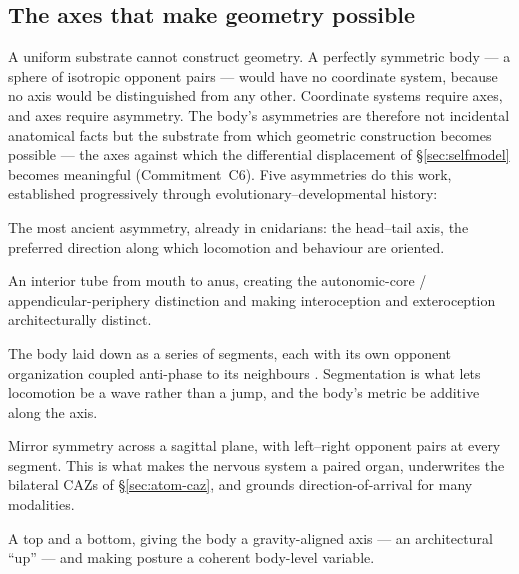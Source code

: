 \documentclass{article}
\begin{document}
\subsection{The axes that make geometry possible}\label{sec:kit-axes}

A uniform substrate cannot construct geometry.  A perfectly symmetric
body --- a sphere of isotropic opponent pairs --- would have no
coordinate system, because no axis would be distinguished from any
other.  Coordinate systems require axes, and axes require asymmetry.
The body's asymmetries are therefore not incidental anatomical facts
but the substrate from which geometric construction becomes possible
--- the axes against which the differential displacement of
\S\ref{sec:selfmodel} becomes meaningful (Commitment~C6).  Five
asymmetries do this work, established progressively through
evolutionary--developmental history:

\begin{description}[itemsep=2pt,labelindent=0pt,leftmargin=2em,
                    style=nextline]
\item[Polarity (anterior--posterior)]
The most ancient asymmetry, already in cnidarians: the head--tail axis,
the preferred direction along which locomotion and behaviour are
oriented.
\item[Tubularity (oral--aboral; inside--outside)]
An interior tube from mouth to anus, creating the autonomic-core /
appendicular-periphery distinction and making interoception and
exteroception architecturally distinct.
\item[Segmentation (rostral--caudal repetition)]
The body laid down as a series of segments, each with its own opponent
organization coupled anti-phase to its neighbours
\citep{McGinnisKrumlauf1992Hox,Carroll2005EndlessForms}.  Segmentation
is what lets locomotion be a wave rather than a jump, and the body's
metric be additive along the axis.
\item[Bilaterality (left--right)]
Mirror symmetry across a sagittal plane, with left--right opponent
pairs at every segment.  This is what makes the nervous system a paired
organ, underwrites the bilateral CAZs of \S\ref{sec:atom-caz}, and
grounds direction-of-arrival for many modalities.
\item[Dorso-ventrality (dorsal--ventral)]
A top and a bottom, giving the body a gravity-aligned axis --- an
architectural ``up'' --- and making posture a coherent body-level
variable.
\end{description}
\end{document}

